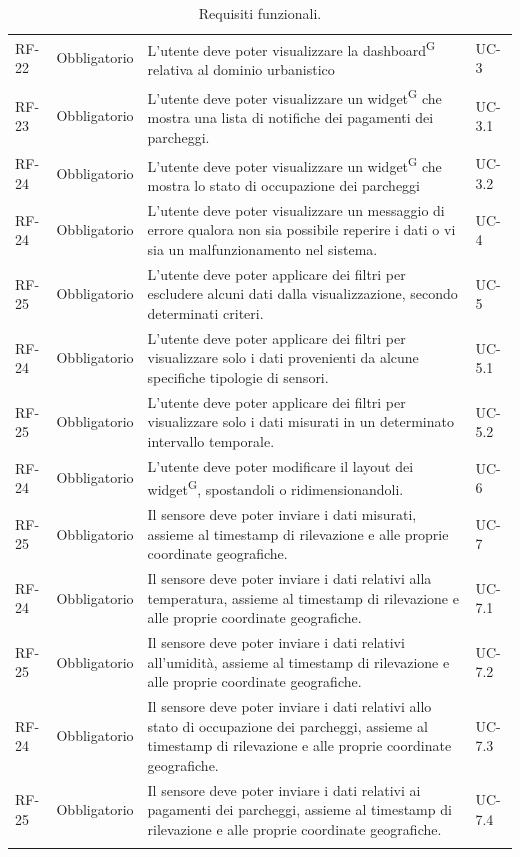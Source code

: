 \documentclass[8pt]{article}
\newcommand{\glossterm}[1]{#1\textsuperscript{G}} %
\begin{document}
\begin{longtable}{p{1.2cm} p{2cm} p{8cm} p{3cm}}
            RF-22 & Obbligatorio & L'utente deve poter visualizzare la \glossterm{dashboard} relativa al dominio urbanistico & UC-3 \\
            RF-23 & Obbligatorio & L'utente deve poter visualizzare un \glossterm{widget} che mostra una lista di notifiche dei pagamenti dei parcheggi. & UC-3.1 \\
            RF-24 & Obbligatorio & L'utente deve poter visualizzare un \glossterm{widget} che mostra lo stato di occupazione dei parcheggi & UC-3.2 \\
            RF-24 & Obbligatorio & L'utente deve poter visualizzare un messaggio di errore qualora non sia possibile reperire i dati o vi sia un malfunzionamento nel sistema. & UC-4 \\
            RF-25 & Obbligatorio & L'utente deve poter applicare dei filtri per escludere alcuni dati dalla visualizzazione, secondo determinati criteri. & UC-5 \\
            RF-24 & Obbligatorio & L'utente deve poter applicare dei filtri per visualizzare solo i dati provenienti da alcune specifiche tipologie di sensori. & UC-5.1 \\
            RF-25 & Obbligatorio & L'utente deve poter applicare dei filtri per visualizzare solo i dati misurati in un determinato intervallo temporale. & UC-5.2 \\
            RF-24 & Obbligatorio & L'utente deve poter modificare il layout dei \glossterm{widget}, spostandoli o ridimensionandoli. & UC-6 \\
            RF-25 & Obbligatorio & Il sensore deve poter inviare i dati misurati, assieme al timestamp di rilevazione e alle proprie coordinate geografiche. & UC-7 \\
            RF-24 & Obbligatorio & Il sensore deve poter inviare i dati relativi alla temperatura, assieme al timestamp di rilevazione e alle proprie coordinate geografiche. & UC-7.1 \\
            RF-25 & Obbligatorio & Il sensore deve poter inviare i dati relativi all'umidità, assieme al timestamp di rilevazione e alle proprie coordinate geografiche. & UC-7.2 \\
            RF-24 & Obbligatorio & Il sensore deve poter inviare i dati relativi allo stato di occupazione dei parcheggi, assieme al timestamp di rilevazione e alle proprie coordinate geografiche. & UC-7.3 \\
            RF-25 & Obbligatorio & Il sensore deve poter inviare i dati relativi ai pagamenti dei parcheggi, assieme al timestamp di rilevazione e alle proprie coordinate geografiche. & UC-7.4 \\
		\bottomrule
	\caption{Requisiti funzionali.}
	\label{table:Requisiti funzionali} \\
\end{longtable}
\end{document}
